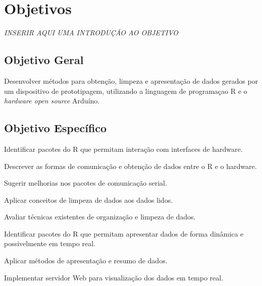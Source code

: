 \chapter[Objetivos]{Objetivos}

  \emph{INSERIR AQUI UMA INTRODUÇÃO AO OBJETIVO}

\section{Objetivo Geral}\label{sec-objetivoGeral}

Desenvolver métodos para obtenção, limpeza e apresentação de dados gerados por 
um dispositivo de prototipagem, utilizando a linguagem de programaçao R e o 
\emph{hardware open source} Arduíno.

\section{Objetivo Específico}\label{sec-objetivoEspecifico}

\begin{alineas}
  
  \item Identificar pacotes do R que permitam interação com interfaces de hardware.
  \item Descrever as formas de comunicação e obtenção de dados entre o R e o hardware.
  \item Sugerir melhorias nos pacotes de comunicação serial.
  \item Aplicar conceitos de limpeza de dados aos dados lidos.
  \item Avaliar técnicas existentes de organização e limpeza de dados.
  \item Identificar pacotes do R que permitam apresentar dados de forma dinâmica e 
  possivelmente em tempo real.
  \item Aplicar métodos de apresentação e resumo de dados.
  \item Implementar servidor Web para visualização dos dados em tempo real.
  
\end{alineas}